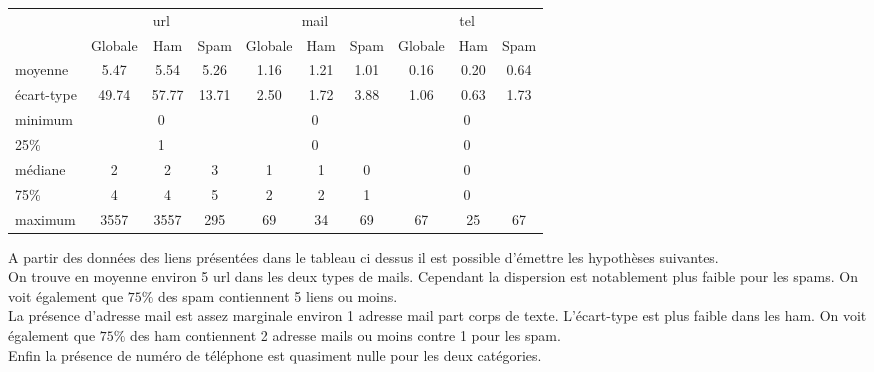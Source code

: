 \documentclass[a4paper,12pt]{article}
\begin{document}
			\begin{table}[H]
					\centering
					 \label{tab:p1liens}
					\begin{tabular}{|l|c|c|c|c|c|c|c|c|c|}
						\hline
						 	& \multicolumn{3}{|c|}{url} & \multicolumn{3}{|c|}{mail} & \multicolumn{3}{|c|}{tel}\\
						 	& Globale & Ham & Spam & Globale & Ham & Spam & Globale & Ham & Spam \\
						\hline
						moyenne    & 5.47 & 5.54 & 5.26 & 1.16 & 1.21 & 1.01 & 0.16 & 0.20 & 0.64 \\
						\hline
						écart-type & 49.74 & 57.77 & 13.71    & 2.50 & 1.72 & 3.88     & 1.06 & 0.63 & 1.73 \\
						\hline
						minimum    & \multicolumn{3}{|c|}{0} & \multicolumn{3}{|c|}{0} & \multicolumn{3}{|c|}{0} \\
						\hline
						25\%       & \multicolumn{3}{|c|}{1}     & \multicolumn{3}{|c|}{0}    & \multicolumn{3}{|c|}{0} \\
						\hline
						médiane    & 2 & 2 & 3     & 1 & 1 & 0   & \multicolumn{3}{|c|}{0} \\
						\hline
						75\%       & 4 & 4 & 5    & 2 & 2 & 1    & \multicolumn{3}{|c|}{0} \\
						\hline
						maximum    & 3557 & 3557 & 295  & 69 & 34 & 69  & 67 & 25 & 67 \\
						\hline
					\end{tabular}
				\end{table}
				
				A partir des données des liens présentées dans le tableau ci dessus il est possible d'émettre les hypothèses suivantes.\\
				On trouve en moyenne environ 5 url dans les deux types de mails. Cependant la dispersion est notablement plus faible pour les spams. On voit également que $75\%$ des spam contiennent 5 liens ou moins. \\
				La présence d'adresse mail est assez marginale environ 1 adresse mail part corps de texte. L'écart-type est plus faible dans les ham. On voit également que $75\%$ des ham contiennent 2 adresse mails ou moins contre 1 pour les spam.\\
				Enfin la présence de numéro de téléphone est quasiment nulle pour les deux catégories. 
				
\end{document}
